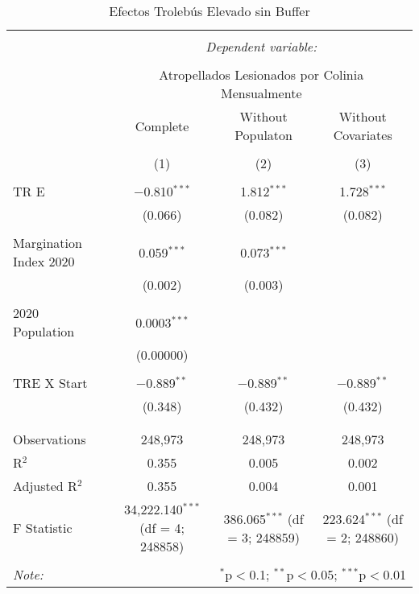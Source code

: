 
\begin{table}[!htbp] \centering 
  \caption{Efectos Trolebús Elevado sin Buffer} 
  \label{} 
\begin{tabular}{@{\extracolsep{5pt}}lccc} 
\\[-1.8ex]\hline 
\hline \\[-1.8ex] 
 & \multicolumn{3}{c}{\textit{Dependent variable:}} \\ 
\cline{2-4} 
\\[-1.8ex] & \multicolumn{3}{c}{Atropellados Lesionados por Colinia Mensualmente} \\ 
 & Complete & Without Populaton & Without Covariates \\ 
\\[-1.8ex] & (1) & (2) & (3)\\ 
\hline \\[-1.8ex] 
 TR E & $-$0.810$^{***}$ & 1.812$^{***}$ & 1.728$^{***}$ \\ 
  & (0.066) & (0.082) & (0.082) \\ 
  & & & \\ 
 Margination Index 2020 & 0.059$^{***}$ & 0.073$^{***}$ &  \\ 
  & (0.002) & (0.003) &  \\ 
  & & & \\ 
 2020 Population & 0.0003$^{***}$ &  &  \\ 
  & (0.00000) &  &  \\ 
  & & & \\ 
 TRE X Start & $-$0.889$^{**}$ & $-$0.889$^{**}$ & $-$0.889$^{**}$ \\ 
  & (0.348) & (0.432) & (0.432) \\ 
  & & & \\ 
\hline \\[-1.8ex] 
Observations & 248,973 & 248,973 & 248,973 \\ 
R$^{2}$ & 0.355 & 0.005 & 0.002 \\ 
Adjusted R$^{2}$ & 0.355 & 0.004 & 0.001 \\ 
F Statistic & 34,222.140$^{***}$ (df = 4; 248858) & 386.065$^{***}$ (df = 3; 248859) & 223.624$^{***}$ (df = 2; 248860) \\ 
\hline 
\hline \\[-1.8ex] 
\textit{Note:}  & \multicolumn{3}{r}{$^{*}$p$<$0.1; $^{**}$p$<$0.05; $^{***}$p$<$0.01} \\ 
\end{tabular} 
\end{table} 
